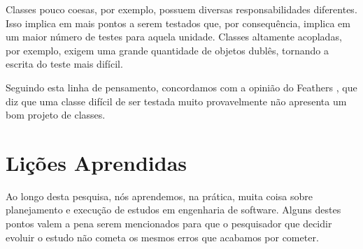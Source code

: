Classes pouco coesas, por exemplo, possuem diversas responsabilidades diferentes.
Isso implica em mais pontos a serem testados que, por consequência, implica
em um maior número de testes para aquela unidade. Classes altamente acopladas,
por exemplo, exigem uma grande quantidade de objetos dublês, tornando a escrita
do teste mais difícil.

Seguindo esta linha de pensamento, concordamos com a opinião do Feathers \cite{feathers-synergy}, 
que diz que uma classe difícil de ser testada muito provavelmente
não apresenta um bom projeto de classes.

\section{Lições Aprendidas}

Ao longo desta pesquisa, nós aprendemos, na prática, muita coisa sobre planejamento
e execução de estudos em engenharia de software. Alguns destes pontos valem
a pena serem mencionados para que o pesquisador que decidir evoluir o estudo
não cometa os mesmos erros que acabamos por cometer. 

